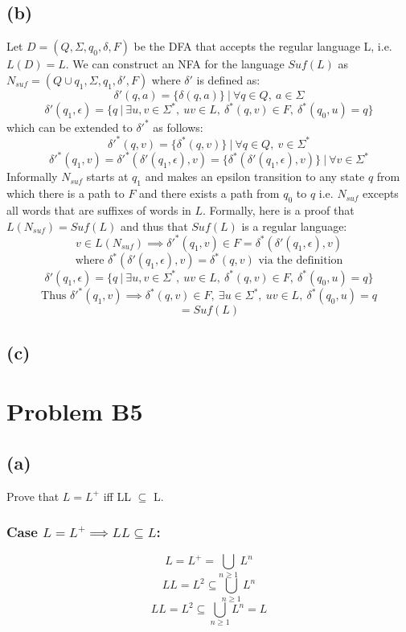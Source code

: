 \documentclass[12pt]{article}
\begin{document}
\subsection*{(b)}
  Let $D = (Q, \Sigma, q_0, \delta, F)$ be the DFA that accepts the regular
  language L, i.e. $L(D) = L$. We can construct an NFA for the language
  $Suf(L)$ as $N_{suf} = (Q\cup{q_1}, \Sigma, q_1, \delta{'}, F)$
  where $\delta{'}$ is defined as:
  $$\delta{'}(q, a) = \{\delta(q,a)\} \:|\: \forall q \in Q ,\: a \in \Sigma$$
  $$\delta{'}(q_1, \epsilon) = \{q \:|\: \exists u,v \in \Sigma^* ,\:
  uv \in L ,\: \delta^* (q,v) \in F ,\: \delta^* (q_0,u) = q\}$$
  which can be extended to $\delta{'}^*$ as follows:
  $$\delta{'}^*(q, v) = \{\delta^*(q,v)\} \:|\:
  \forall q \in Q ,\: v \in \Sigma^*$$
  $$\delta{'}^*(q_1, v) = \delta{'}^*(\delta{'}(q_1, \epsilon), v) =
  \{\delta^*(\delta{'}(q_1, \epsilon), v)\} \:|\: \forall v \in \Sigma^*$$
  Informally $N_{suf}$ starts at $q_1$ and makes
  an epsilon transition to any state $q$ from which there is a path to $F$ and
  there exists a path from $q_0$ to $q$ i.e. $N_{suf}$ excepts all words that
  are suffixes of words in $L$. Formally, here is a proof that
  $L(N_{suf}) = Suf(L)$ and thus that $Suf(L)$ is a regular language:
  $$ v \in L(N_{suf}) \implies \delta{'}^*(q_1, v) \in F =
  \delta^*(\delta{'}(q_1, \epsilon), v) $$
  $$\text{where }\delta^*(\delta{'}(q_1, \epsilon), v) = \delta^*(q, v)
  \text{ via the definition}$$
  $$\delta{'}(q_1, \epsilon) = \{q \:|\: \exists u,v \in \Sigma^* ,\:
  uv \in L ,\: \delta^* (q,v) \in F ,\: \delta^* (q_0,u) = q\}$$
  $$\text{Thus }\delta{'}^* (q_1,v) \implies
  \delta^* (q,v) \in F ,\: \exists u \in \Sigma^* ,\: uv \in L ,\:
  \delta^* (q_0,u) = q$$
  $$ = Suf(L)$$

\subsection*{(c)}

\section*{Problem B5}
\subsection*{(a)} Prove that $L=L^+$ iff LL $\subseteq$ L.
\subsubsection*{Case $L=L^+ \implies LL \subseteq L$:}
$$L = L^+ = \bigcup\limits_{n\ge1} L^n$$
$$LL = L^2 \subseteq \bigcup\limits_{n\ge1} L^n$$
$$LL = L^2 \subseteq \bigcup\limits_{n\ge1} L^n = L$$
\end{document}
